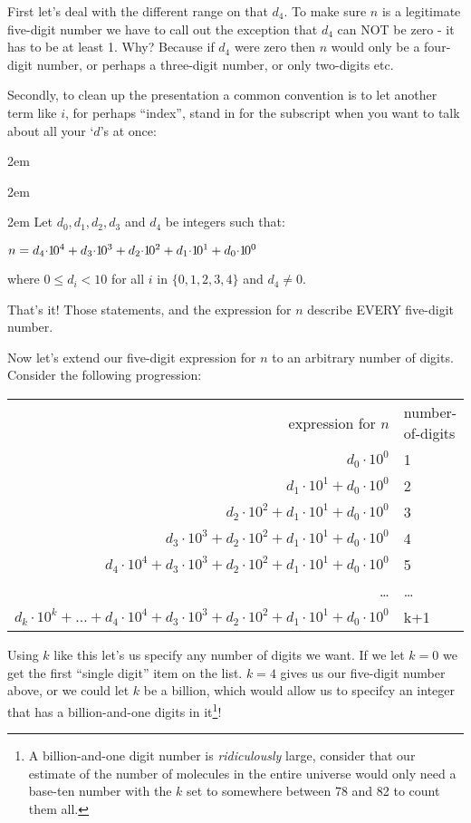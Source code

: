 \documentclass{article}
\newenvironment{jprIn}{\begin{adjustwidth}{2em}{}}{\end{adjustwidth}}
\begin{document}
First let's deal with the different range on that $d_4$. To make sure $n$ is a legitimate five-digit number we have to
call out the exception that $d_4$ can NOT be zero - it has to be at least 1.
Why? Because if $d_4$ were zero then $n$ would only be a
four-digit number, or perhaps a three-digit number, or only two-digits etc.

Secondly, to clean up the presentation
a common convention
is to let another term like $i$, for perhaps ``index'', stand in for the subscript
when you want to talk about all your `$d$'s at once:
\begin{jprIn}
\begin{jprIn}
\begin{jprIn}
Let $d_0, d_1, d_2,d_3$ and $d_4$ be integers such that:

\hspace{3em}$n=d_4{\cdot}{1\hspace{-0.12em}0}^4+d_3{\cdot}{1\hspace{-0.12em}0}^3+d_2{\cdot}{1\hspace{-0.12em}0}^2+d_1{\cdot}{1\hspace{-0.12em}0}^1+d_0{\cdot}{1\hspace{-0.12em}0}^0$

where $0\le{}d_i<10$ for all $i$ in $\{0,1,2,3,4\}$ and $d_4\ne0$.
\end{jprIn}
\end{jprIn}
\end{jprIn}
That's it! Those statements, and the expression for $n$ describe EVERY five-digit number.

Now let's extend
our five-digit expression for $n$ to an arbitrary
number of digits.
Consider the following progression:
\begin{center}
\begin{tabular}{r l}
expression for $n$ & number-of-digits\\
$d_0{\cdot}10^0$ & 1\\
$d_1{\cdot}10^1+d_0{\cdot}10^0$ & 2\\
$d_2{\cdot}10^2+d_1{\cdot}10^1+d_0{\cdot}10^0$ & 3\\
$d_3{\cdot}10^3+d_2{\cdot}10^2+d_1{\cdot}10^1+d_0{\cdot}10^0$ & 4\\
$d_4{\cdot}10^4+d_3{\cdot}10^3+d_2{\cdot}10^2+d_1{\cdot}10^1+d_0{\cdot}10^0$ & 5\\
\dots{} & \dots{}\\
$d_k{\cdot}10^k+\dots{}+d_4{\cdot}10^4+d_3{\cdot}10^3+d_2{\cdot}10^2+d_1{\cdot}10^1+d_0{\cdot}10^0$ & k+1
\end{tabular}
\end{center}
Using $k$ like this let's us specify any number of digits we want.
If we let $k=0$ we get the first ``single digit'' 
item on the list.  $k=4$ gives us our five-digit number above,
or we could let $k$ be a billion, which would allow
us to specifcy an integer that has a billion-and-one
digits in it\footnote{A billion-and-one digit number is 
\emph{ridiculously} large,
consider that our estimate of the number of molecules in
the entire universe would only need a base-ten
number with the $k$ set to somewhere between 78 and 82 to count them all.}!
\end{document}
